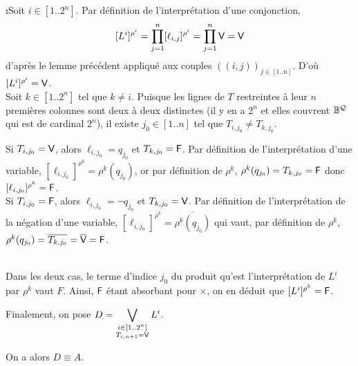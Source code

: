 			\eqskip{2mm}
			\begin{Preuve}
				\i Soit \(i \in [1..2^n]\). Par définition de l'interprétation d'une conjonction,
					\[
						[L^i]^{\rho^i} = \prod_{j=1}^n [\ell_{i,j}]^{\rho^i} = \prod_{j=1}^n \text{\sf{V}} = \text{\sf{V}}
					\]
				d'après le lemme précédent appliqué aux couples \(((i,j))_{j \in [1..n]}\). D'où \([L^i]^{\rho^i} = \text{\sf{V}}\). \\[3mm]
				\ii Soit \(k \in [1..2^n]\) tel que \(k \neq i\). Puisque les lignes de \(T\) restreintes à leur \(n\) premières colonnes sont deux à deux distinctes (il y en a \(2^n\) et elles couvrent \(\mathbb{B}^{\mathcal{Q}}\) qui est de cardinal \(2^n\)), il existe \(j_0 \in [1..n]\) tel que \(T_{i,j_0} \neq T_{k,j_0}\). \\[3mm]
					\hspace*{5mm} \parbox{161mm}{
					\bdot Si \(T_{i,j_0} = \text{\sf{V}}\), alors \(\ell_{i,j_0} = q_{j_0}\) et \(T_{k,j_0} = \text{\sf{F}}\).	Par définition de l'interprétation d'une variable, \([\ell_{i,j_0}]^{\rho^k} =  \rho^k (q_{j_0})\), or par définition de \(\rho^k\), \(\rho^k (q_{j_0}) = T_{k,j_0} = \text{\sf{F}}\) donc \([\ell_{i,j_0}]^{\rho^k} = \text{\sf{F}}\). \\[2mm]
					\bdot Si \(T_{i,j_0} = \text{\sf{F}}\), alors \(\ell_{i,j_0} = \neg q_{j_0}\) et \(T_{k,j_0} = \text{\sf{V}}\). Par définition de l'interprétation de la négation d'une variable, \([\ell_{i,j_0}]^{\rho^k} = \overline{\rho^k (q_{j_0})}\) qui vaut, par définition de \(\rho^k\), \(\rho^k (q_{j_0}) = \overline{T_{k,j_0}} =\overline{\text{\sf{V}}} = \text{\sf{F}}\).
					} \\[3mm]
				Dans les deux cas, le terme d'indice \(j_0\) du produit qu'est l'interprétation de \(L^i\) par \(\rho^k\) vaut \(F\). \nt
				Ainsi, \(\text{\sf{F}}\) étant absorbant pour \(\times\), on en déduit que \([L^i]^{\rho^k} = \text{\sf{F}}\).
			\end{Preuve}
			
			\begin{Notation}
			Finalement, on pose \(\displaystyle D = \bigvee_{\substack{i \in [1..2^n] \\ T_{i,n+1} = \text{\sf{V}}}} L^i\). \end{Notation}
		
			\begin{Propriete}
				On a alors \(D\equiv A\).
			\end{Propriete}
		
